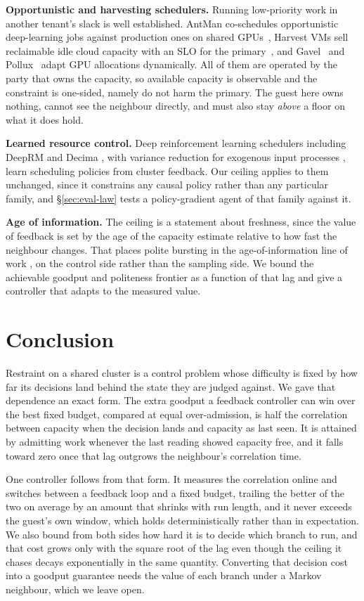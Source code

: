 \documentclass[10pt,conference,letterpaper]{IEEEtran}
\theoremstyle{remark}\newtheorem{remark}{Remark}
\begin{document}
\textbf{Opportunistic and harvesting schedulers.} Running low-priority work in
another tenant's slack is well established. AntMan co-schedules opportunistic
deep-learning jobs against production ones on shared GPUs~\cite{antman}, Harvest
VMs sell reclaimable idle cloud capacity with an SLO for the
primary~\cite{harvestvm}, and Gavel~\cite{gavel} and Pollux~\cite{pollux} adapt
GPU allocations dynamically. All of them are operated by the party that owns the
capacity, so available capacity is observable and the constraint is one-sided,
namely do not harm the primary. The guest here owns nothing, cannot see the
neighbour directly, and must also stay \emph{above} a floor on what it does hold.

\textbf{Learned resource control.} Deep reinforcement learning schedulers
including DeepRM \cite{deeprm} and Decima \cite{decima}, with variance reduction
for exogenous input processes \cite{inputdriven}, learn scheduling policies from
cluster feedback. Our ceiling applies to them unchanged, since it constrains any
causal policy rather than any particular family, and \S\ref{sec:eval-law} tests a
policy-gradient agent of that family against it.

\textbf{Age of information.} The ceiling is a statement about freshness, since the
value of feedback is set by the age of the capacity estimate relative to how fast
the neighbour changes. That places polite bursting in the age-of-information line
of work \cite{aoi}, on the control side rather than the sampling side. We bound
the achievable goodput and politeness frontier as a function of that lag and give a
controller that adapts to the measured value.

\section{Conclusion}
\label{sec:concl}
Restraint on a shared cluster is a control problem whose difficulty is fixed by
how far its decisions land behind the state they are judged against. We gave that
dependence an exact form. The extra goodput a feedback controller can win over the
best fixed budget, compared at equal over-admission, is half the correlation
between capacity when the decision lands and capacity as last seen. It is attained
by admitting work whenever the last reading showed capacity free, and it falls
toward zero once that lag outgrows the neighbour's correlation time.

One controller follows from that form. It measures the correlation online and
switches between a feedback loop and a fixed budget, trailing the better of the two
on average by an amount that shrinks with run length, and it never exceeds the
guest's own window, which holds deterministically rather than in expectation. We
also bound from both sides how hard
it is to decide which branch to run, and that cost grows only with the square root
of the lag even though the ceiling it chases decays exponentially in the same
quantity. Converting that decision cost into a goodput guarantee needs the value of
each branch under a Markov neighbour, which we leave open.
\end{document}
